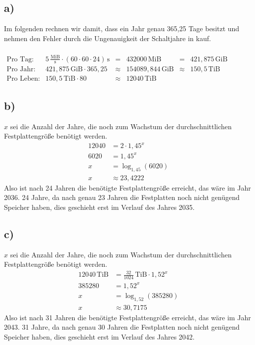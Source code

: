 \documentclass[a4paper]{scrartcl}
\begin{document}
	\subsection{a)}
		Im folgenden rechnen wir damit, dass ein Jahr genau 365,25 Tage besitzt und nehmen den 
		Fehler durch die Ungenauigkeit der Schaltjahre in kauf.\\ \\
		\(
		\begin{array}{llclcl}
			\text{Pro Tag:} & 5\,\frac{\text{MiB}}{\text{s}}\cdot (60\cdot 60\cdot 24)\,\text{s} &=& 
				432000\,\text{MiB} &=& 421,875\,\text{GiB} \\
			\text{Pro Jahr:} & 421,875\,\text{GiB}\cdot 365,25 &\approx & 154089,844\,\text{GiB} 	
				&\approx & 150,5\,\text{TiB} \\
			\text{Pro Leben:} & 150,5\,\text{TiB}\cdot 80 &\approx & 12040\,\text{TiB}
		\end{array}
		\)

	\subsection{b)}
		\(x\) sei die Anzahl der Jahre, die noch zum Wachstum der durchschnittlichen Festplattengröße 
		benötigt werden. 
		\begin{align}
			12040 &= 2\cdot 1,45^x \\
			6020 &= 1,45^x \\
			x &= \log_{1,45}(6020) \\
			x &\approx 23,4222 
		\end{align}
		Also ist nach 24 Jahren die benötigte Festplattengröße erreicht, das wäre im Jahr 2036.
		24 Jahre, da nach genau 23 Jahren die Festplatten noch nicht genügend Speicher haben, dies 
		geschieht erst im Verlauf des Jahres 2035.

	\subsection{c)}
		\(x\) sei die Anzahl der Jahre, die noch zum Wachstum der durchschnittlichen Festplattengröße 
		benötigt werden. 
		\begin{align}
			12040\,\text{TiB} &= \frac{32}{1024}\,\text{TiB} \cdot 1,52^x \\
			385280 &= 1,52^x \\
			x &= \log_{1,52}(385280) \\
			x &\approx 30,7175
		\end{align}
		Also ist nach 31 Jahren die benötigte Festplattengröße erreicht, das wäre im Jahr 2043.
		31 Jahre, da nach genau 30 Jahren die Festplatten noch nicht genügend Speicher haben, dies 
		geschieht erst im Verlauf des Jahres 2042.
		
\end{document}
